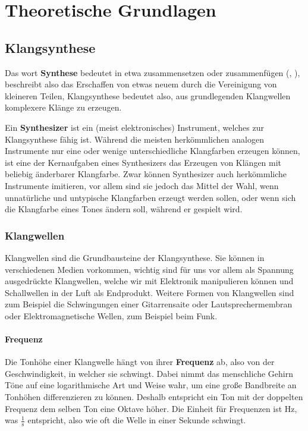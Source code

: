 \chapter{Theoretische Grundlagen}

\section{Klangsynthese}
\label{sec:org4ac0915}
Das wort \textbf{Synthese} bedeutet in etwa zusammensetzen oder zusammenfügen (, ), beschreibt also das Erschaffen von etwas neuem durch die Vereinigung von kleineren Teilen, Klangsynthese bedeutet also, aus grundlegenden Klangwellen komplexere Klänge zu erzeugen.

Ein \textbf{Synthesizer} ist ein (meist elektronisches) Instrument, welches zur Klangsynthese fähig ist. Während die meisten herkömmlichen analogen Instrumente nur eine oder wenige unterschiedliche Klangfarben erzeugen können, ist eine der Kernaufgaben eines Synthesizers das Erzeugen von Klängen mit beliebig änderbarer Klangfarbe. Zwar können Synthesizer auch herkömmliche Instrumente imitieren, vor allem sind sie jedoch das Mittel der Wahl, wenn unnatürliche und untypische Klangfarben erzeugt werden sollen, oder wenn sich die Klangfarbe eines Tones ändern soll, während er gespielt wird.

\subsection{Klangwellen}
\label{sec:org428ed5a}
Klangwellen sind die Grundbausteine der Klangsynthese. Sie können in verschiedenen Medien vorkommen, wichtig sind für uns vor allem als Spannung ausgedrückte Klangwellen, welche wir mit Elektronik manipulieren können und Schallwellen in der Luft als Endprodukt. Weitere Formen von Klangwellen sind zum Beispiel die Schwingungen einer Gitarrensaite oder Lautsprechermembran oder Elektromagnetische Wellen, zum Beispiel beim Funk.

\subsubsection{Frequenz}
\label{sec:org1667fea}
Die Tonhöhe einer Klangwelle hängt von ihrer \textbf{Frequenz} ab, also von der Geschwindigkeit, in welcher sie schwingt. Dabei nimmt das menschliche Gehirn Töne auf eine logarithmische Art und Weise wahr, um eine große Bandbreite an Tonhöhen differenzieren zu können. Deshalb entspricht ein Ton mit der doppelten Frequenz dem selben Ton eine Oktave höher. Die Einheit für Frequenzen ist \si{\hertz}, was \(\frac{1}{\si{\second}}\) entspricht, also wie oft die Welle in einer Sekunde schwingt.

